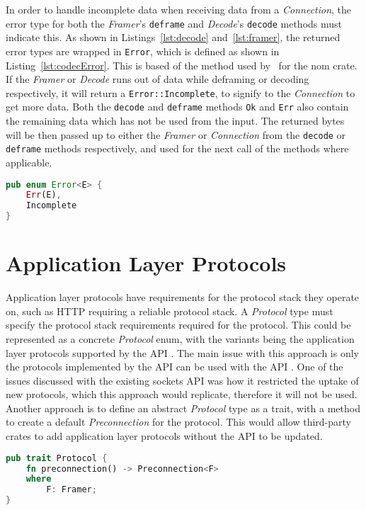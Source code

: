 In order to handle incomplete data when receiving data from a \emph{Connection}, the error type for both the
\emph{Framer}'s \texttt{deframe} and \emph{Decode}'s \texttt{decode} methods must indicate this.
As shown in Listings~\ref{lst:decode} and~\ref{lst:framer}, the returned error types are wrapped in \texttt{Error},
which is defined as shown in Listing~\ref{lst:codecError}.
This is based of the method used by~\cite{geal_nomerr_nodate} for the nom crate.
If the \emph{Framer} or \emph{Decode} runs out of data while deframing or decoding respectively, it will return a
\texttt{Error::Incomplete}, to signify to the \emph{Connection} to get more data.
Both the \texttt{decode} and \texttt{deframe} methods \texttt{Ok} and \texttt{Err} also contain the remaining data which
has not be used from the input.
The returned bytes will be then passed up to either the \emph{Framer} or \emph{Connection} from the \texttt{decode} or
\texttt{deframe} methods respectively, and used for the next call of the methods where applicable.

\begin{lstlisting}[language=Rust, float=h, label=lst:codecError, caption={The Error type for deframe and decode methods,
    showing the Incomplete varient.}]
pub enum Error<E> {
    Err(E),
    Incomplete
}
\end{lstlisting}

\section{Application Layer Protocols}\label{sec:application-layer-protocols}
Application layer protocols have requirements for the protocol stack they operate on, such as HTTP requiring a reliable
protocol stack.
A \emph{Protocol} type must specify the protocol stack requirements required for the protocol.
This could be represented as a concrete \emph{Protocol} enum, with the variants being the application layer protocols
supported by the API .
The main issue with this approach is only the protocols implemented by the API can be used with the API .
One of the issues discussed with the existing sockets API was how it restricted the uptake of new protocols, which this
approach would replicate, therefore it will not be used.
Another approach is to define an abstract \emph{Protocol} type as a trait, with a method to create a default
\emph{Preconnection} for the protocol.
This would allow third-party crates to add application layer protocols without the API to be updated.

\begin{lstlisting}[language=Rust, float=h, label=lst:protocol, caption={The Protocol trait, add more info here}]
pub trait Protocol {
    fn preconnection() -> Preconnection<F>
    where
        F: Framer;
}
\end{lstlisting}


